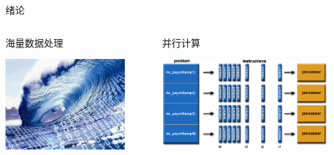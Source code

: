 \begin{frame}[t]{绪论}



\begin{columns}
    \begin{column}{0.4 \textwidth}

        \begin{center}
        \alert{海量数据处理}

        \vspace{1em}
        \includegraphics[height=3.5cm]{figures/seaamountdata.jpeg}
        \end{center}


    \end{column}

    \pause
    \begin{column}{0.6 \textwidth}

        \begin{center}
            \alert{并行计算}

            \vspace{1em}
            \includegraphics[height=3.5cm]{figures/parallelcomputation.png}
        \end{center}
       
    \end{column}

\end{columns}




\end{frame}

